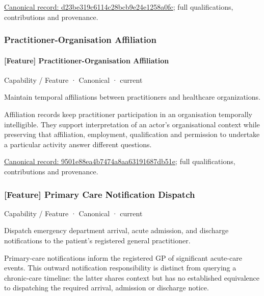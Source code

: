 {\footnotesize \href{../../../../continuum/strategy/capability/feature/d23be319c6114c28bcb9e24e1258a0fc.md}{Canonical record: d23be319c6114c28bcb9e24e1258a0fc}; full qualifications, contributions and provenance.}\par
\subsubsection{Practitioner-Organisation Affiliation}

\paragraph{[Feature] Practitioner-Organisation Affiliation}

\label{element:9501e88ea4b7474a8aa63191687db51e}
{\small Capability / Feature · Canonical · current}\par

Maintain temporal affiliations between practitioners and healthcare organizations.



Affiliation records keep practitioner participation in an organisation temporally intelligible. They support interpretation of an actor's organisational context while preserving that affiliation, employment, qualification and permission to undertake a particular activity answer different questions.


{\footnotesize \href{../../../../continuum/strategy/capability/feature/9501e88ea4b7474a8aa63191687db51e.md}{Canonical record: 9501e88ea4b7474a8aa63191687db51e}; full qualifications, contributions and provenance.}\par
\subsubsection{[Feature] Primary Care Notification Dispatch}

\label{element:56739765fcfd4084b38d4550593ee74d}
{\small Capability / Feature · Canonical · current}\par

Dispatch emergency department arrival, acute admission, and discharge notifications to the patient's registered general practitioner.



Primary-care notifications inform the registered GP of significant acute-care events. This outward notification responsibility is distinct from querying a chronic-care timeline: the latter shares context but has no established equivalence to dispatching the required arrival, admission or discharge notice.


